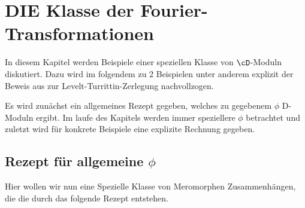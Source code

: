 \chapter{DIE Klasse der Fourier-Transformationen}
In diesem Kapitel werden Beispiele einer speziellen Klasse von $\cD$-Moduln
diskutiert. Dazu wird im folgendem zu 2 Beispielen unter anderem explizit der
Beweis aus \cite{sabbah_cimpa90} zur Levelt-Turrittin-Zerlegung nachvollzogen.

Es wird zunächst ein allgemeines Rezept gegeben, welches zu gegebenem $\phi$
D-Moduln ergibt. Im laufe des Kapitels werden immer speziellere $\phi$
betrachtet und zuletzt wird für konkrete Beispiele eine explizite Rechnung
gegeben.

\section{Rezept für allgemeine $\phi$} \label{sec:allgemeinProblem}
Hier wollen wir nun eine Spezielle Klasse von Meromorphen Zusammenhängen, die
die durch das folgende Rezept entstehen.
